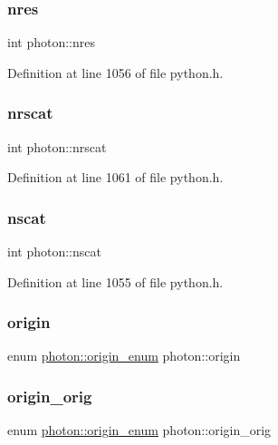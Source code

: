 \subsubsection{\texorpdfstring{nres}{nres}}
{\footnotesize\ttfamily int photon\+::nres}



Definition at line 1056 of file python.\+h.

\mbox{\label{structphoton_a96a247f2621b88fe5313dbfdeca7d37f}} 
\subsubsection{\texorpdfstring{nrscat}{nrscat}}
{\footnotesize\ttfamily int photon\+::nrscat}



Definition at line 1061 of file python.\+h.

\mbox{\label{structphoton_af295c65faf17c8e83c2547a95509e665}} 
\subsubsection{\texorpdfstring{nscat}{nscat}}
{\footnotesize\ttfamily int photon\+::nscat}



Definition at line 1055 of file python.\+h.

\mbox{\label{structphoton_a201206174a8fa79b29526a68e20704cf}} 
\subsubsection{\texorpdfstring{origin}{origin}}
{\footnotesize\ttfamily enum \hyperlink{structphoton_a6e3512103ffd5c0d6004cd432cdc4c3a}{photon\+::origin\+\_\+enum}  photon\+::origin}

\mbox{\label{structphoton_a1b0fcf48345bbe1f6bc480294b054850}} 
\subsubsection{\texorpdfstring{origin\+\_\+orig}{origin\_orig}}
{\footnotesize\ttfamily enum \hyperlink{structphoton_a6e3512103ffd5c0d6004cd432cdc4c3a}{photon\+::origin\+\_\+enum}  photon\+::origin\+\_\+orig}

